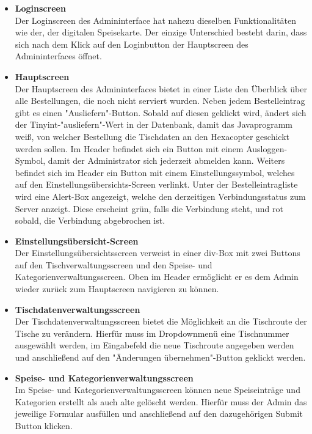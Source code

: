 \begin{itemize}
    \item \textbf{Loginscreen}\\
Der Loginscreen des Admininterface hat nahezu dieselben Funktionalitäten wie der, der digitalen Speisekarte. Der einzige Unterschied besteht darin, dass sich nach dem Klick auf den Loginbutton der Hauptscreen des Admininterfaces öffnet.
    \item \textbf{Hauptscreen}\\
Der Hauptscreen des Admininterfaces bietet in einer Liste den Überblick über alle Bestellungen, die noch nicht serviert wurden. 
Neben jedem Bestelleintrag gibt es einen "Ausliefern"-Button. Sobald auf diesen geklickt wird, ändert sich der Tinyint-"ausliefern"-Wert in der Datenbank, damit das Javaprogramm weiß, von welcher Bestellung die Tischdaten an den Hexacopter geschickt werden sollen.
Im Header befindet sich ein Button mit einem Ausloggen-Symbol, damit der Administrator sich jederzeit abmelden kann. Weiters befindet sich im Header ein Button mit einem Einstellungssymbol, welches auf den Einstellungsübersichts-Screen verlinkt.
Unter der Bestelleintragliste wird eine Alert-Box angezeigt, welche den derzeitigen Verbindungsstatus zum Server anzeigt. Diese erscheint grün, falls die Verbindung steht, und rot sobald, die Verbindung abgebrochen ist.
    \item \textbf{Einstellungsübersicht-Screen}\\
Der Einstellungsübersichtsscreen verweist in einer div-Box mit zwei Buttons auf den Tischverwaltungsscreen und den Speise- und Kategorienverwaltungsscreen.
Oben im Header ermöglicht er es dem Admin wieder zurück zum Hauptscreen navigieren zu können.
    \item \textbf{Tischdatenverwaltungsscreen}\\
Der Tischdatenverwaltungsscreen bietet die Möglichkeit an die Tischroute der Tische zu verändern. Hierfür muss im Dropdownmenü eine Tischnummer ausgewählt werden, im Eingabefeld die neue Tischroute angegeben werden und anschließend auf den "Änderungen übernehmen"-Button geklickt werden.
    \item \textbf{Speise- und Kategorienverwaltungsscreen}\\
Im Speise- und Kategorienverwaltungsscreen können neue Speiseinträge und Kategorien erstellt als auch alte gelöscht werden.      
Hierfür muss der Admin das jeweilige Formular ausfüllen und anschließend auf den dazugehörigen Submit Button klicken.
  \end{itemize} 
